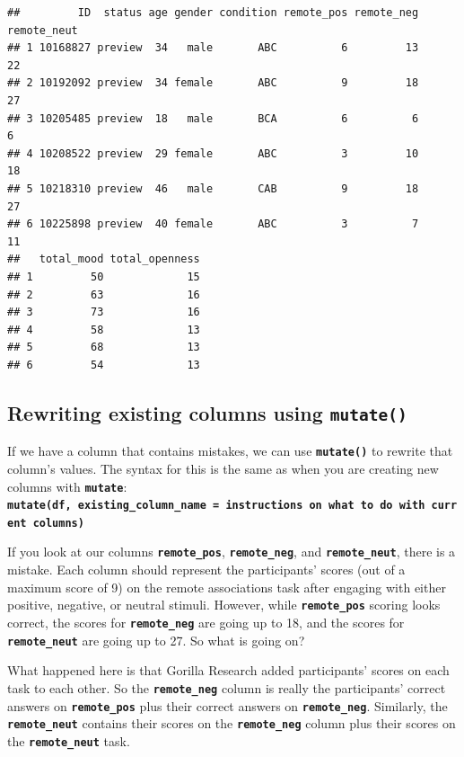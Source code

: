 \documentclass[
]{book}
\begin{document}
\begin{verbatim}
##         ID  status age gender condition remote_pos remote_neg remote_neut
## 1 10168827 preview  34   male       ABC          6         13          22
## 2 10192092 preview  34 female       ABC          9         18          27
## 3 10205485 preview  18   male       BCA          6          6           6
## 4 10208522 preview  29 female       ABC          3         10          18
## 5 10218310 preview  46   male       CAB          9         18          27
## 6 10225898 preview  40 female       ABC          3          7          11
##   total_mood total_openness
## 1         50             15
## 2         63             16
## 3         73             16
## 4         58             13
## 5         68             13
## 6         54             13
\end{verbatim}

\hypertarget{rewriting-existing-columns-using-mutate}{%
\subsection{\texorpdfstring{Rewriting existing columns using \texttt{mutate()}}{Rewriting existing columns using mutate()}}\label{rewriting-existing-columns-using-mutate}}

If we have a column that contains mistakes, we can use \textbf{\texttt{mutate()}} to rewrite that column's values. The syntax for this is the same as when you are creating new columns with \textbf{\texttt{mutate}}: \textbf{\texttt{mutate(df,\ existing\_column\_name\ =\ instructions\ on\ what\ to\ do\ with\ current\ columns)}}

If you look at our columns \textbf{\texttt{remote\_pos}}, \textbf{\texttt{remote\_neg}}, and \textbf{\texttt{remote\_neut}}, there is a mistake. Each column should represent the participants' scores (out of a maximum score of 9) on the remote associations task after engaging with either positive, negative, or neutral stimuli. However, while \textbf{\texttt{remote\_pos}} scoring looks correct, the scores for \textbf{\texttt{remote\_neg}} are going up to 18, and the scores for \textbf{\texttt{remote\_neut}} are going up to 27. So what is going on?

What happened here is that Gorilla Research added participants' scores on each task to each other. So the \textbf{\texttt{remote\_neg}} column is really the participants' correct answers on \textbf{\texttt{remote\_pos}} plus their correct answers on \textbf{\texttt{remote\_neg}}. Similarly, the \textbf{\texttt{remote\_neut}} contains their scores on the \textbf{\texttt{remote\_neg}} column plus their scores on the \textbf{\texttt{remote\_neut}} task.
\end{document}
